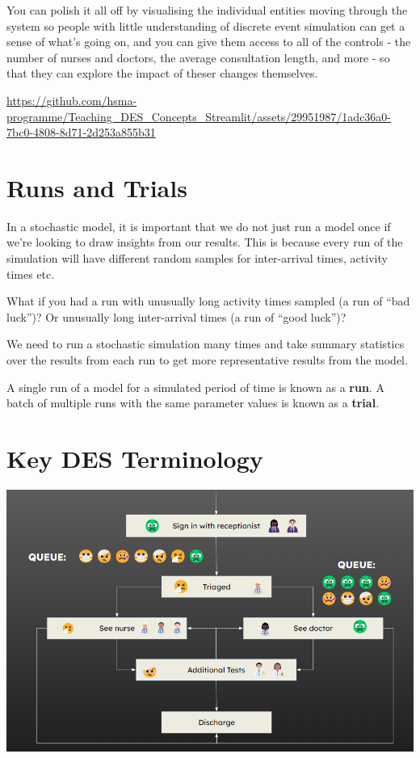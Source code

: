 \documentclass[
  letterpaper,
  DIV=11,
  numbers=noendperiod]{scrreprt}
\begin{document}
You can polish it all off by visualising the individual entities moving
through the system so people with little understanding of discrete event
simulation can get a sense of what's going on, and you can give them
access to all of the controls - the number of nurses and doctors, the
average consultation length, and more - so that they can explore the
impact of theser changes themselves.

\url{https://github.com/hsma-programme/Teaching_DES_Concepts_Streamlit/assets/29951987/1adc36a0-7bc0-4808-8d71-2d253a855b31}

\section{Runs and Trials}\label{runs-and-trials}

In a stochastic model, it is important that we do not just run a model
once if we're looking to draw insights from our results. This is because
every run of the simulation will have different random samples for
inter-arrival times, activity times etc.

What if you had a run with unusually long activity times sampled (a run
of ``bad luck'')? Or unusually long inter-arrival times (a run of ``good
luck'')?

We need to run a stochastic simulation many times and take summary
statistics over the results from each run to get more representative
results from the model.

A single run of a model for a simulated period of time is known as a
\textbf{run}. A batch of multiple runs with the same parameter values is
known as a \textbf{trial}.

\section{Key DES Terminology}\label{key-des-terminology}

\includegraphics{images/example_des_simple.png}
\end{document}
